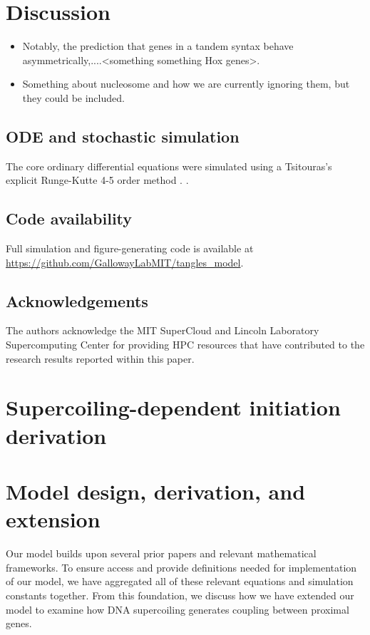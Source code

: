 \documentclass[11pt]{article}
\begin{document}
\FloatBarrier
\section{Discussion}

\begin{itemize}
    \item Notably, the prediction that genes in a tandem syntax behave asymmetrically,....<something something Hox genes>.
    \item Something about nucleosome and how we are currently ignoring them, but they could be included.
\end{itemize}

\subsection{ODE and stochastic simulation}
The core ordinary differential equations were simulated using a Tsitouras's explicit Runge-Kutte 4-5 order method \parencite{tsitourasRungeKuttaPairs2011}.
\parencite{rackauckasDifferentialEquationsJlPerformant2017}.

\subsection{Code availability}
Full simulation and figure-generating code is available at \url{https://github.com/GallowayLabMIT/tangles_model}.

\subsection{Acknowledgements}
The authors acknowledge the MIT SuperCloud and Lincoln Laboratory Supercomputing Center \parencite{reutherInteractiveSupercomputing402018} for providing HPC resources that have contributed to the research results reported within this paper.

\printbibliography

\clearpage
\appendix
\renewcommand{\appendixpagename}{Supplemental information}
\renewcommand{\thefigure}{S\arabic{figure}}
\setcounter{figure}{0}
\appendixpage
\section{Supercoiling-dependent initiation derivation} \label{sec:sc_initation_derivation}


\section{Model design, derivation, and extension}
\label{sec:appendix:model}
Our model builds upon several prior papers and relevant mathematical frameworks. To ensure access and provide definitions needed for implementation of our model, we have aggregated all of these relevant equations and simulation constants together. From this foundation, we discuss how we have extended our model to examine how DNA supercoiling generates coupling between proximal genes.
\end{document}
